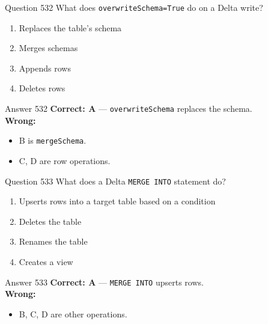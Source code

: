\documentclass[aspectratio=169,11pt]{beamer}
\begin{document}
	\begin{frame}{Question 532}
		What does \texttt{overwriteSchema=True} do on a Delta write?
		\begin{enumerate}[label=\Alph*.]
			\item Replaces the table's schema
			\item Merges schemas
			\item Appends rows
			\item Deletes rows
		\end{enumerate}
	\end{frame}
	\begin{frame}{Answer 532}
		\textbf{Correct: A} --- \texttt{overwriteSchema} replaces the schema.\\
		\vspace{0.5em}
		\textbf{Wrong:}
		\begin{itemize}
			\item B is \texttt{mergeSchema}.
			\item C, D are row operations.
		\end{itemize}
	\end{frame}
	
	\begin{frame}{Question 533}
		What does a Delta \texttt{MERGE INTO} statement do?
		\begin{enumerate}[label=\Alph*.]
			\item Upserts rows into a target table based on a condition
			\item Deletes the table
			\item Renames the table
			\item Creates a view
		\end{enumerate}
	\end{frame}
	\begin{frame}{Answer 533}
		\textbf{Correct: A} --- \texttt{MERGE INTO} upserts rows.\\
		\vspace{0.5em}
		\textbf{Wrong:}
		\begin{itemize}
			\item B, C, D are other operations.
		\end{itemize}
	\end{frame}
	
\end{document}
